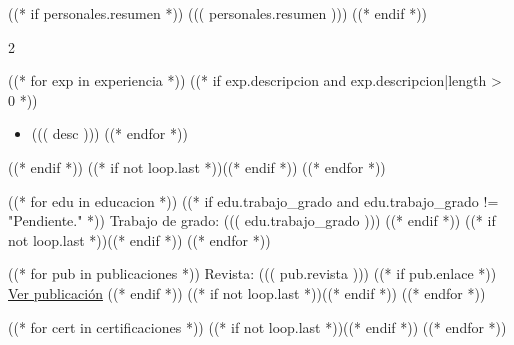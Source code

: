 \documentclass[10pt,a4paper,ragged2e,withhyper]{altacv}
\begin{document}


\makecvheader

((* if personales.resumen *))
((( personales.resumen )))
\medskip
((* endif *))

\begin{paracol}{2}

((* for exp in experiencia *))
((* if exp.descripcion and exp.descripcion|length > 0 *))
\begin{itemize}
  ((* for desc in exp.descripcion *))
  \item ((( desc )))
  ((* endfor *))
\end{itemize}
((* endif *))
((* if not loop.last *))\divider((* endif *))
((* endfor *))

\medskip

((* for edu in educacion *))
((* if edu.trabajo_grado and edu.trabajo_grado != "Pendiente." *))
Trabajo de grado: ((( edu.trabajo_grado )))
((* endif *))
((* if not loop.last *))\divider((* endif *))
((* endfor *))

\medskip

((* for pub in publicaciones *))
Revista: ((( pub.revista )))
((* if pub.enlace *))
\href{ ((( pub.enlace ))) }{Ver publicación}
((* endif *))
((* if not loop.last *))\divider((* endif *))
((* endfor *))

((* for cert in certificaciones *))
((* if not loop.last *))\divider((* endif *))
((* endfor *))


\end{paracol}
\end{document}
